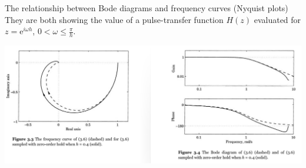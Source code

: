 \documentclass[presentation,aspectratio=169]{beamer}
\begin{document}
\begin{frame}[label=sec-5-5]{The relationship between Bode diagrams and frequency curves (Nyquist plots)}
They are both showing the value of a pulse-transfer function $H(z)$ evaluated for $z = \mathrm{e}^{i\omega h}$, $0<\omega \le \frac{\pi}{h}$.

\begin{center}
\includegraphics[width=\linewidth]{../../figures/fig3-3-4.png}
\end{center}
\end{frame}
\end{document}
